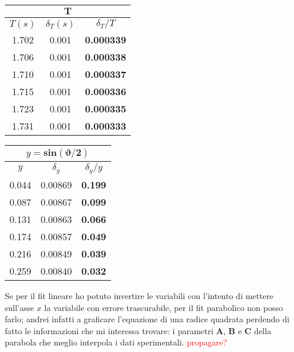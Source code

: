\documentclass{article}
\begin{document}
	
	\begin{minipage}{0.5\textwidth}
		\begin{table}[H]
			\centering
			\begin{tabular}{@{}ccc@{}}
				\multicolumn{3}{c}{$\mathbf{T}$} \\ \midrule
				$T(s)$ & $\delta_T (s)$ & $\delta_T / T$ \\ \midrule
				1.702 & 0.001 & \textbf{0.000339} \\
				1.706 & 0.001 & \textbf{0.000338} \\
				1.710 & 0.001 & \textbf{0.000337} \\
				1.715 & 0.001 & \textbf{0.000336} \\
				1.723 & 0.001 & \textbf{0.000335} \\
				1.731 & 0.001 & \textbf{0.000333}  \\ \bottomrule   
			\end{tabular}
		\end{table}
	\end{minipage}
	\begin{minipage}{0.5\textwidth}
		\begin{table}[H]
			\centering
			\begin{tabular}{@{}ccc@{}}
				
				\multicolumn{3}{c}{$y = \mathbf{sin{\left(\vartheta/2\right)}}$} \\ \midrule
				$y$ & $\delta_y$ & $\delta_y / y$ \\ \midrule
				0.044 & 0.00869 & \textbf{0.199} \\
				0.087 & 0.00867 & \textbf{0.099} \\
				0.131 & 0.00863 & \textbf{0.066} \\
				0.174 & 0.00857 & \textbf{0.049} \\
				0.216 & 0.00849 & \textbf{0.039} \\
				0.259 & 0.00840 & \textbf{0.032}  \\ \bottomrule  
			\end{tabular}
		\end{table}
	\end{minipage}
	\vspace{1cm}
	
	
	\noindent
	Se per il fit lineare ho potuto invertire le variabili con l'intento di mettere sull'asse $x$ la variabile con errore trascurabile, per il fit parabolico non posso farlo; andrei infatti a graficare l'equazione di una radice quadrata perdendo di fatto le informazioni che mi interessa trovare: i parametri \textbf{A}, \textbf{B} e \textbf{C} della parabola che meglio interpola i dati sperimentali. \textcolor{red}{propagare?}
	
\end{document}
